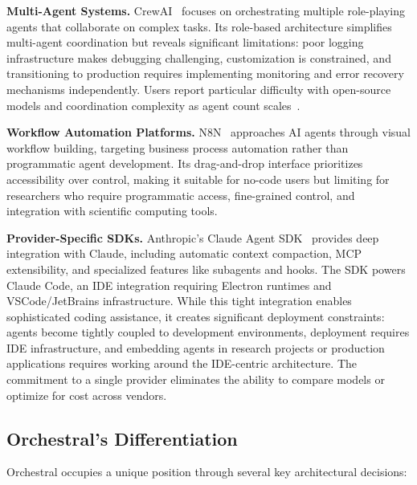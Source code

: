\documentclass{article}
\begin{document}
\textbf{Multi-Agent Systems.} CrewAI~\cite{crewai} focuses on orchestrating multiple role-playing agents that collaborate on complex tasks. Its role-based architecture simplifies multi-agent coordination but reveals significant limitations: poor logging infrastructure makes debugging challenging, customization is constrained, and transitioning to production requires implementing monitoring and error recovery mechanisms independently. Users report particular difficulty with open-source models and coordination complexity as agent count scales~\cite{crewai-limitations}.

\textbf{Workflow Automation Platforms.} N8N~\cite{n8n} approaches AI agents through visual workflow building, targeting business process automation rather than programmatic agent development. Its drag-and-drop interface prioritizes accessibility over control, making it suitable for no-code users but limiting for researchers who require programmatic access, fine-grained control, and integration with scientific computing tools.

\textbf{Provider-Specific SDKs.} Anthropic's Claude Agent SDK~\cite{claude-sdk} provides deep integration with Claude, including automatic context compaction, MCP extensibility, and specialized features like subagents and hooks. The SDK powers Claude Code, an IDE integration requiring Electron runtimes and VSCode/JetBrains infrastructure. While this tight integration enables sophisticated coding assistance, it creates significant deployment constraints: agents become tightly coupled to development environments, deployment requires IDE infrastructure, and embedding agents in research projects or production applications requires working around the IDE-centric architecture. The commitment to a single provider eliminates the ability to compare models or optimize for cost across vendors.

\subsection{Orchestral's Differentiation}

Orchestral occupies a unique position through several key architectural decisions:
\end{document}
